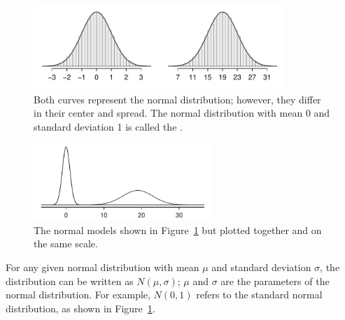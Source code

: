 \begin{figure}[hht]
\centering
\includegraphics[width=0.85\textwidth]{ch_distributions_oi_biostat/figures/twoSampleNormals/twoSampleNormals}
\caption{Both curves represent the normal distribution; however, they differ in their center and spread. The normal distribution with mean 0 and standard deviation 1 is called the .}
\label{twoSampleNormals}
\end{figure}

\begin{figure}[hht]
\centering
\includegraphics[width=0.6\textwidth]{ch_distributions_oi_biostat/figures/twoSampleNormalsStacked/twoSampleNormalsStacked}
\caption{The normal models shown in Figure~\ref{twoSampleNormals} but plotted together and on the same scale.}
\label{twoSampleNormalsStacked}
\end{figure}

For any given normal distribution with mean $\mu$ and standard deviation $\sigma$, the distribution can be written as $N(\mu, \sigma)$; $\mu$ and $\sigma$ are the parameters of the normal distribution.  For example, $N(0, 1)$ refers to the standard normal distribution, as shown in Figure~\ref{twoSampleNormals}. 

